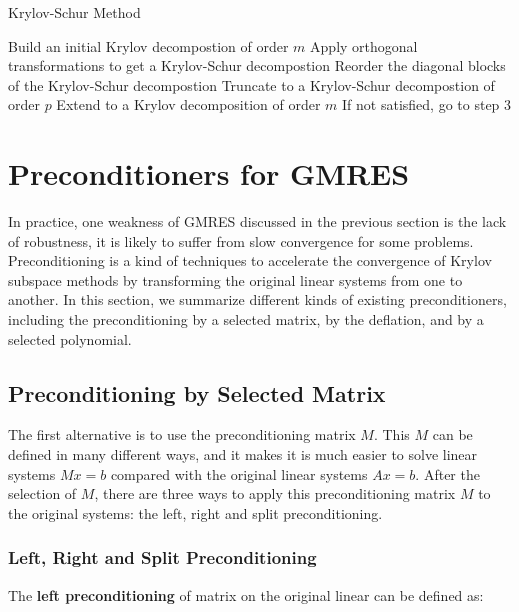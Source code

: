 \begin{algorithm}[htbp]{}
	\caption{Krylov-Schur Method}   
	\label{alg:krylov-schur}   
	\begin{algorithmic}[1]
		\State Build an initial Krylov decompostion of order $m$
		\State Apply orthogonal transformations to get a Krylov-Schur decompostion
		\State Reorder the diagonal blocks of the Krylov-Schur decompostion
		\State Truncate to a Krylov-Schur decompostion of order $p$
		\State Extend to a Krylov decomposition of order $m$
		\State If not satisfied, go to step 3
		\EndFunction
	\end{algorithmic}  
\end{algorithm}


\section{Preconditioners for GMRES}\label{Preconditioners for GMRES}

In practice, one weakness of GMRES discussed in the previous section is the lack of robustness, it is likely to suffer from slow convergence for some problems. Preconditioning is a kind of techniques to accelerate the convergence of Krylov subspace methods by transforming the original linear systems from one to another. In this section, we summarize different kinds of existing preconditioners, including the preconditioning by a selected matrix, by the deflation, and by a selected polynomial.

\subsection{Preconditioning by Selected Matrix}

The first alternative is to use the preconditioning matrix $M$. This $M$ can be defined in many different ways, and it makes it is much easier to solve linear systems $Mx=b$ compared with the original linear systems $Ax=b$. After the selection of $M$, there are three ways to apply this preconditioning matrix $M$ to the original systems: the left, right and split preconditioning.

\subsubsection{Left, Right and Split Preconditioning}\label{Left, Right and Split Preconditioning}

The \textbf{left preconditioning} of matrix on the original linear can be defined as:

